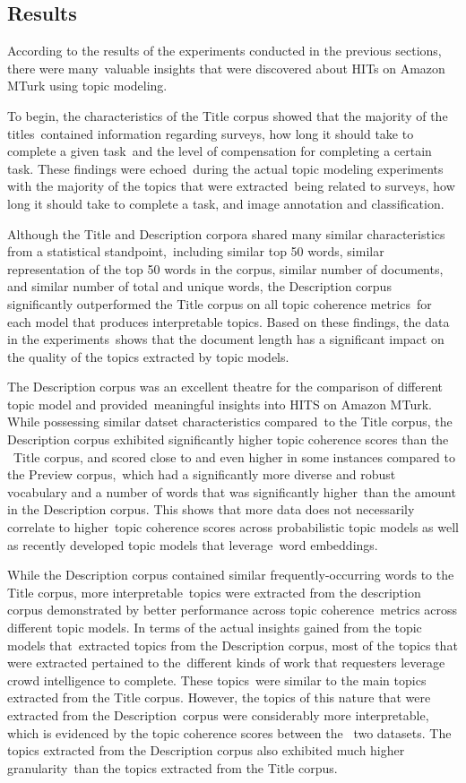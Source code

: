 \documentclass[letterpaper,12pt]{article}
\begin{document}
\subsection{Results}
According to the results of the experiments conducted in the previous sections, there were many\
valuable insights that were discovered about HITs on Amazon MTurk using topic modeling.\

To begin, the characteristics of the Title corpus showed that the majority of the titles\
contained information regarding surveys, how long it should take to complete a given task\
and the level of compensation for completing a certain task. These findings were echoed\
during the actual topic modeling experiments with the majority of the topics that were extracted\
being related to surveys, how long it should take to complete a task, and image annotation and classification.

Although the Title and Description corpora shared many similar characteristics from a statistical standpoint,\
including similar top 50 words, similar representation of the top 50 words in the corpus, similar number of documents,
and similar number of total and unique words, the Description corpus significantly outperformed the Title corpus on all topic coherence metrics\
for each model that produces interpretable topics. Based on these findings, the data in the experiments\
shows that the document length has a significant impact on the quality of the topics extracted by topic models.

The Description corpus was an excellent theatre for the comparison of different topic model and provided\
meaningful insights into HITS on Amazon MTurk. While possessing similar datset characteristics compared\
to the Title corpus, the Description corpus exhibited significantly higher topic coherence scores than the \
Title corpus, and scored close to and even higher in some instances compared to the Preview corpus,\
which had a significantly more diverse and robust vocabulary and a number of words that was significantly higher\
than the amount in the Description corpus. This shows that more data does not necessarily correlate to higher\
topic coherence scores across probabilistic topic models as well as recently developed topic models that leverage\
word embeddings.

While the Description corpus contained similar frequently-occurring words to the Title corpus, more interpretable\
topics were extracted from the description corpus demonstrated by better performance across topic coherence\
metrics across different topic models. In terms of the actual insights gained from the topic models that\
extracted topics from the Description corpus, most of the topics that were extracted pertained to the\
different kinds of work that requesters leverage crowd intelligence to complete. These topics\
were similar to the main topics extracted from the Title corpus. However, the topics of this nature that were extracted from the Description\
corpus were considerably more interpretable, which is evidenced by the topic coherence scores between the \
two datasets. The topics extracted from the Description corpus also exhibited much higher granularity\
than the topics extracted from the Title corpus.
\end{document}
